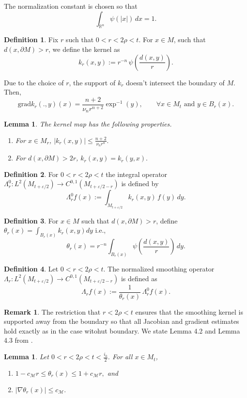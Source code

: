 \documentclass[10 pt, reqno]{amsart}
\newcommand{\M}{\mathcal{M}}
\newtheorem{lemma}[theorem]{Lemma}
\theoremstyle{definition}
\newtheorem{definition}{Definition}
\newtheorem{remark}[theorem]{Remark}
\numberwithin{equation}{section}
\begin{document}
The normalization constant is chosen so that
\[
\int_{\mathbb{R}^n}\psi(|x|)\,dx = 1.
\]
\begin{definition}
  Fix $r$ such that $0<r<2\rho<t$.  For $x\in M$, such that $d(x,\partial M)>r$,  we define the kernel as
\[
k_r(x,y)
:=
r^{-n}\,\psi\!\left(\frac{d(x,y)}{r}\right).
\]
 
\end{definition}

Due to the choice of $r$, the support of $k_r$ doesn't intersect the boundary of $M$. Then, \[\mathrm{grad}k_r(.,y)(x)=\frac{n+2}{\nu_nr^{n+2}}\exp^{-1}(y), \qquad \forall x\in M_t \text{ and } y\in B_r(x).\]

\begin{lemma}
\label{eq:kernel_symmetric}
The kernel map has the following properties.
    \begin{enumerate}
        \item For $x\in M_r$, $    \big| k_r(x,y)\big|\le\frac{n+2}{\nu_nr^n}.$
\item For $d(x,\partial M)>2r$, $k_r(x,y)=k_r(y,x).$

    \end{enumerate}
\end{lemma}

\begin{definition}\label{def:smoothing-Mrho}
For $0<r<2\rho<t$ the integral operator $\Lambda_r^0 \colon L^2(M_{t+\varepsilon/2})\to C^{0,1}(M_{t+\varepsilon/2-r})$ is defined
by
\[
\Lambda^0_r f(x)
:=
\int_{M_{t+\varepsilon/2}} k_r(x,y)\,f(y)\,dy.
\]
\end{definition}
\begin{definition}
   For $x\in M$ such that $d(x,\partial M)>r$, define $\theta_r(x)=\int_{B_r(x)}k_r(x,y)dy$ i.e.,
\[
\theta_r(x)=r^{-n}\int_{B_r(x)} \psi\!\left(\frac{d(x,y)}{r}\right)\,dy.
\]
 
\end{definition}

\begin{definition}\label{def:normalized-smoothing}
Let $0<r<2\rho<t$. The normalized smoothing operator $
\Lambda_r \colon L^2(M_{t+\varepsilon/2})\to C^{0,1}(M_{t+\varepsilon/2-r})
$ is defined as 
\[
\Lambda_r f(x)
:=
\frac{1}{\theta_r(x)}\,\Lambda^0_r f(x).
\]
\end{definition}
\begin{remark}
The restriction that $r<2\rho<t$ ensures that the smoothing kernel is supported away from the boundary so that all Jacobian and gradient estimates hold exactly as in the case witohut boundary. We state Lemma 4.2 and Lemma 4.3 from \cite{MaityBhattacharya2026}.
\end{remark}
\begin{lemma}\label{lem:theta-Mrho}
Let $0<r<2\rho<t<\frac{i_0}{2}$. For all $x\in M_t$,
\begin{enumerate}
    \item $1-c_\M r \le \theta_r(x) \le 1+ c_\M r,$ and
    \item $|\nabla \theta_r(x)| \le c_\M .$
\end{enumerate}
\end{lemma}
\end{document}
